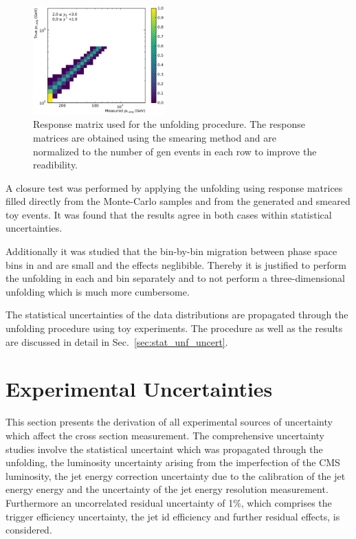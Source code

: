 \begin{figure}[htp]
    \includegraphics[width=0.45\textwidth]{figures/measurement/res_matrix_ptavg_normalized_yb2ys0.pdf}
    \caption[Response matrix used for the unfolding procedure]{Response matrix used for the unfolding procedure. The response matrices are obtained
            using the smearing method and are normalized to the number of gen events in each row to improve
            the readibility.}
    \label{fig:res_matrix}
\end{figure}

A closure test was performed by applying the unfolding using response matrices
filled directly from the Monte-Carlo samples and from the generated and smeared
toy events. It was found that the results agree in both cases within statistical
uncertainties.

Additionally it was studied that the bin-by-bin migration between phase space
bins in \ystar and \yboost are small and the effects neglibible. Thereby it is
justified to perform the unfolding in each \ystar and \yboost bin separately and
to not perform a three-dimensional unfolding which is much more cumbersome.

The statistical uncertainties of the data distributions are propagated through
the unfolding procedure using toy experiments. The procedure as well as the
results are discussed in detail in Sec.~\ref{sec:stat_unf_uncert}.


\section{Experimental Uncertainties}
\label{experimental_uncertainties}

This section presents the derivation of all experimental sources of uncertainty
which affect the cross section measurement. The comprehensive uncertainty
studies involve the statistical uncertaint which was propagated through the
unfolding, the luminosity uncertainty arising from the imperfection of the CMS
luminosity, the jet energy correction uncertainty due to the calibration of the
jet energy energy and the uncertainty of the jet energy resolution measurement.
Furthermore an uncorrelated residual uncertainty of 1\%, which comprises the
trigger efficiency uncertainty, the jet id efficiency and further residual
effects, is considered.

